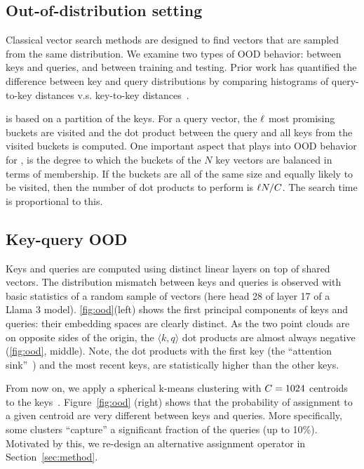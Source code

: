 %


\subsection{Out-of-distribution setting}

Classical vector search methods are designed to find vectors that are sampled \iid from the same distribution. 
We examine two types of OOD behavior: between keys and queries, and between training and testing. 
Prior work has quantified the difference between key and query distributions by comparing histograms of query-to-key distances v.s. key-to-key distances~\citep{jaiswal2022ood,chen2024roargraph}. 

\OURS is based on a partition of the keys. 
For a query vector, the $\ell$ most promising buckets are visited and the dot product between the query and all keys from the visited buckets is computed. 
One important aspect that plays into OOD behavior for \OURS, is the degree to which the buckets of the $N$ key vectors are balanced in terms of membership. 
If the buckets are all of the same size and equally likely to be visited, then the number of dot products to perform is $\ell N / C$. 
The search time is proportional to this.

%
%

%



\subsection{Key-query OOD}

%
Keys and queries are computed using distinct linear layers on top of shared vectors.
%
The  distribution mismatch between keys and queries is observed with basic statistics of a random sample of vectors (here head 28 of layer 17 of a Llama 3 model). %
\autoref{fig:ood}(left) shows the first principal components of keys and queries: their embedding spaces are clearly distinct. 
%
%
As the two point clouds are on opposite sides of the origin, the $\langle k,q \rangle$ dot products are almost always negative (\autoref{fig:ood}, middle).
Note, the dot products with the first key (\ie the ``attention sink''~\citep{xiao2024efficientstreaminglanguagemodels}) and the most recent keys, are statistically higher than the other keys. 

From now on, we apply a spherical k-means clustering with $C=1024$ centroids to the keys~\citep{douze2024faiss}. 
%
Figure~\ref{fig:ood} (right) shows that the probability of assignment to a given centroid are very different between keys and queries.
More specifically, some clusters ``capture'' a significant fraction of the queries (up to 10\%). 
%
Motivated by this, we re-design an alternative assignment operator in Section~\ref{sec:method}. 





